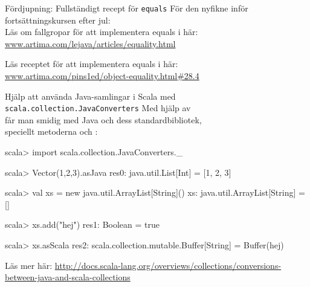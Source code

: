 \begin{Slide}{Fördjupning: Fullständigt recept för \texttt{equals}}
För den nyfikne inför fortsättningskursen efter jul: \\

\vspace{2em}
Läs om fallgropar för att implementera equals i  här: \\
\href{http://www.artima.com/lejava/articles/equality.html}{www.artima.com/lejava/articles/equality.html}


\vspace{2em}
Läs receptet för att implementera equals i  här: \\
\href{http://www.artima.com/pins1ed/object-equality.html#28.4}{www.artima.com/pins1ed/object-equality.html\#28.4}
\end{Slide}



\begin{Slide}{Hjälp att använda Java-samlingar i Scala med \texttt{scala.collection.JavaConverters}}\SlideFontSmall
Med hjälp av  \\
får man smidig  med Java och dess standardbibliotek, \\
speciellt metoderna  och :
\begin{REPL}
scala> import scala.collection.JavaConverters._

scala> Vector(1,2,3).asJava
res0: java.util.List[Int] = [1, 2, 3]

scala> val xs = new java.util.ArrayList[String]()
xs: java.util.ArrayList[String] = []

scala> xs.add("hej")
res1: Boolean = true

scala> xs.asScala
res2: scala.collection.mutable.Buffer[String] = Buffer(hej)
\end{REPL}

Läs mer här: \url{http://docs.scala-lang.org/overviews/collections/conversions-between-java-and-scala-collections}

\end{Slide}





